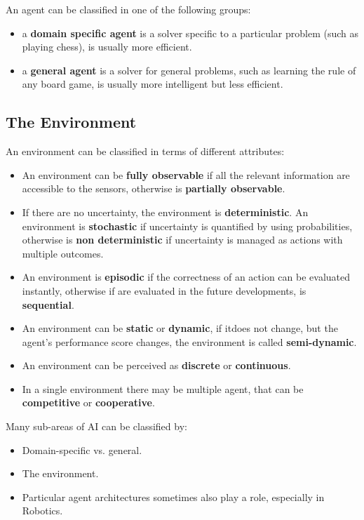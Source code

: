 \documentclass[10pt, letterpaper]{report}
\begin{document}
An agent can be classified in one of the following groups:\begin{itemize}
    \item a \textbf{domain specific agent }  is a solver specific to a particular problem (such as playing chess), is usually more efficient.
    \item a \textbf{general agent} is a solver for general problems, such as learning the rule of any board game, is usually more intelligent but less efficient.
\end{itemize}
\subsection{The Environment}
An environment can be classified in terms of different attributes:\begin{itemize}
    \item An environment can be \textbf{fully observable} if all the relevant information are accessible to the sensors, otherwise is \textbf{partially observable}.
    \item If there are no uncertainty, the environment is \textbf{deterministic}. An environment is \textbf{stochastic} if uncertainty is quantified by using probabilities, otherwise is \textbf{non deterministic} if uncertainty is managed as actions with multiple outcomes.
    \item An environment is \textbf{episodic} if the correctness of an action can be evaluated instantly, otherwise if are evaluated in the future developments, is \textbf{sequential}. 
    \item An environment can be \textbf{static} or \textbf{dynamic}, if itdoes not change, but the agent's performance
score changes, the environment is called \textbf{semi-dynamic}.
    \item An environment can be perceived as \textbf{discrete} or \textbf{continuous}.
    \item In a single environment there may be multiple agent, that can be \textbf{competitive} or \textbf{cooperative}.
\end{itemize}
Many sub-areas of AI can be classified by:\begin{itemize}
    \item Domain-specific vs. general.
    \item The environment.
    \item Particular agent architectures sometimes also play a role, especially
    in Robotics.
\end{itemize}
\end{document}
